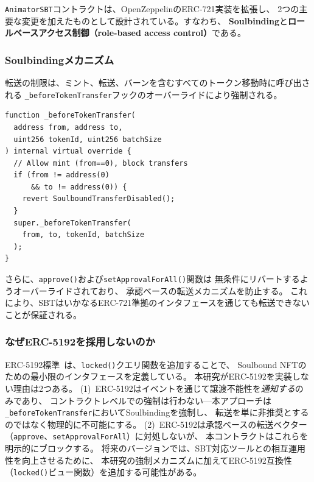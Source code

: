 \texttt{AnimatorSBT}コントラクトは、OpenZeppelinのERC-721実装を拡張し、
2つの主要な変更を加えたものとして設計されている。すなわち、
\textbf{Soulbinding}と\textbf{ロールベースアクセス制御（role-based access control）}である。

\subsubsection{Soulbindingメカニズム}

転送の制限は、ミント、転送、バーンを含むすべてのトークン移動時に呼び出される
\texttt{\_beforeTokenTransfer}フックのオーバーライドにより強制される。

\begin{lstlisting}[basicstyle=\footnotesize\ttfamily, frame=single,
  caption={転送フックによるSoulbindingの強制。},
  label={lst:soulbind},
  morekeywords={function,address,uint256,internal,virtual,override,if,revert,super}]
function _beforeTokenTransfer(
  address from, address to,
  uint256 tokenId, uint256 batchSize
) internal virtual override {
  // Allow mint (from==0), block transfers
  if (from != address(0)
      && to != address(0)) {
    revert SoulboundTransferDisabled();
  }
  super._beforeTokenTransfer(
    from, to, tokenId, batchSize
  );
}
\end{lstlisting}

さらに、\texttt{approve()}および\texttt{setApprovalForAll()}関数は
無条件にリバートするようオーバーライドされており、
承認ベースの転送メカニズムを防止する。
これにより、SBTはいかなるERC-721準拠のインタフェースを通じても転送できないことが保証される。

\subsubsection{なぜERC-5192を採用しないのか}

ERC-5192標準~\cite{daubenschuetz2022erc5192}は、\texttt{locked()}クエリ関数を追加することで、
Soulbound NFTのための最小限のインタフェースを定義している。
本研究がERC-5192を実装しない理由は2つある。
(1)~ERC-5192はイベントを通じて譲渡不能性を\textit{通知する}のみであり、
コントラクトレベルでの強制は行わない---本アプローチは
\texttt{\_beforeTokenTransfer}においてSoulbindingを強制し、
転送を単に非推奨とするのではなく物理的に不可能にする。
(2)~ERC-5192は承認ベースの転送ベクター
（\texttt{approve}、\texttt{setApprovalForAll}）に対処しないが、
本コントラクトはこれらを明示的にブロックする。
将来のバージョンでは、SBT対応ツールとの相互運用性を向上させるために、
本研究の強制メカニズムに加えてERC-5192互換性
（\texttt{locked()}ビュー関数）を追加する可能性がある。

